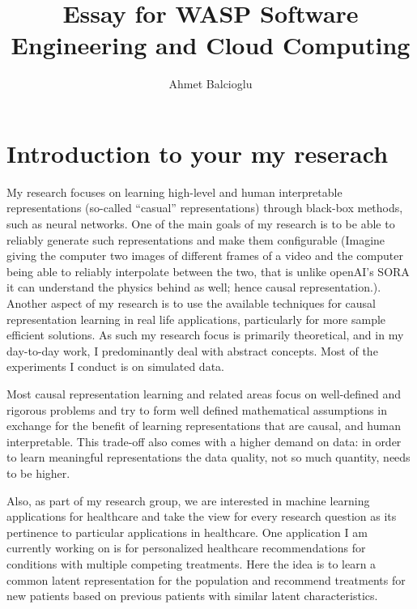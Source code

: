 \documentclass[pra, onecolumn,superscriptaddress,nofootinbib]{revtex4}
\begin{document}
\title{Essay for WASP Software Engineering and Cloud Computing}
\author{Ahmet Balcioglu}
\maketitle


\section{Introduction to your my reserach}

    My research focuses on learning high-level and human interpretable representations (so-called “casual” representations) through black-box methods, such as neural networks. One of the main goals of my research is to be able to reliably generate such representations and make them configurable (Imagine giving the computer two images of different frames of a video and the computer being able to reliably interpolate between the two, that is unlike openAI's SORA it can understand the physics behind as well; hence causal representation.). Another aspect of my research is to use the available techniques for causal representation learning in real life applications, particularly for more sample efficient solutions. As such my research focus is primarily theoretical, and in my day-to-day work, I predominantly deal with abstract concepts. Most of the experiments I conduct is on simulated data.

    Most causal representation learning and related areas focus on well-defined and rigorous problems and try to form well defined mathematical assumptions in exchange for the benefit of learning representations that are causal, and human interpretable. This trade-off also comes with a higher demand on data: in order to learn meaningful representations the data quality, not so much quantity, needs to be higher.

    Also, as part of my research group, we are interested in machine learning applications for healthcare and take the view for every research question as its pertinence to particular applications in healthcare. One application I am currently working on is for personalized healthcare recommendations for conditions with multiple competing treatments. Here the idea is to learn a common latent representation for the population and recommend treatments for new patients based on previous patients with similar latent characteristics. 
\end{document}
